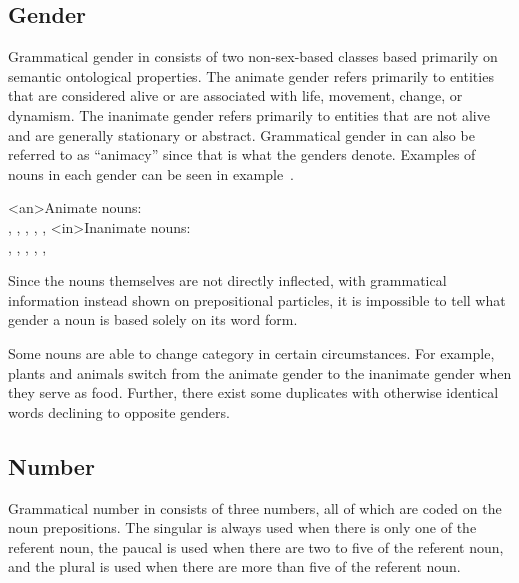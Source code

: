 \subsection{Gender}
\label{subsec:tvk-nouns-gender}

Grammatical gender in \langtvk{} consists of two\autocite{wals-30} non-sex-based\autocite{wals-31} classes based primarily on semantic ontological properties\autocite{wals-32}. The animate gender refers primarily to entities that are considered alive or are associated with life, movement, change, or dynamism. The inanimate gender refers primarily to entities that are not alive and are generally stationary or abstract. Grammatical gender in \langtvk{} can also be referred to as \enquote{animacy} since that is what the genders denote. Examples of nouns in each gender can be seen in example~.

	\a<an>Animate nouns:\\
		 ,  ,  ,  ,  ,  
	\a<in>Inanimate nouns:\\
		 ,  ,  ,  ,  ,  
\xe

Since the nouns themselves are not directly inflected, with grammatical information instead shown on prepositional particles, it is impossible to tell what gender a noun is based solely on its word form.

Some nouns are able to change category in certain circumstances. For example, plants and animals switch from the animate gender to the inanimate gender when they serve as food. Further, there exist some duplicates with otherwise identical words declining to opposite genders.

\subsection{Number}
\label{subsec:tvk-nouns-number}

Grammatical number in \langtvk{} consists of three numbers, all of which are coded on the noun prepositions\autocite{wals-33}. The singular is always used when there is only one of the referent noun, the paucal is used when there are two to five of the referent noun, and the plural is used when there are more than five of the referent noun.


